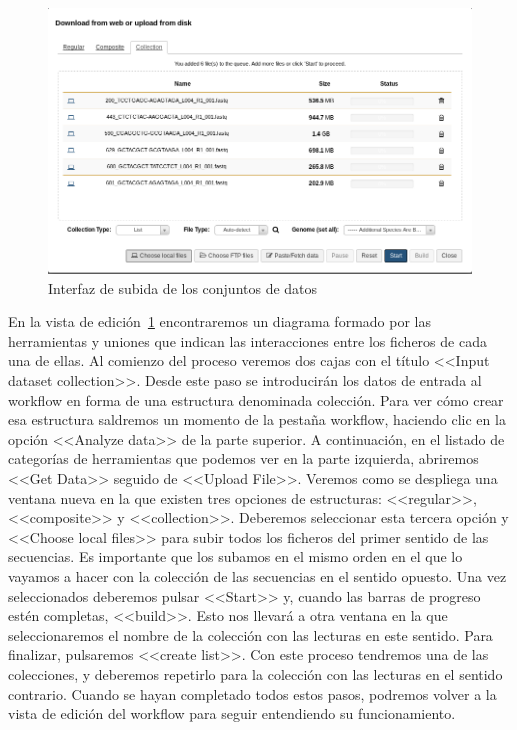 \begin{figure}[!h]
    \begin{center}
      \includegraphics[scale=0.55]{images/SubidaDatasets.png}
      \caption{Interfaz de subida de los conjuntos de datos}
      \label{fig:SubidaDatasets}
    \end{center}
\end{figure}

En la vista de edición~\ref{fig:SubidaDatasets} encontraremos un diagrama formado por las herramientas y uniones que indican las interacciones entre los ficheros de cada una de ellas. Al comienzo del proceso veremos dos cajas con el título <<Input dataset collection>>. Desde este paso se introducirán los datos de entrada al workflow en forma de una estructura denominada colección. Para ver cómo crear esa estructura saldremos un momento de la pestaña workflow, haciendo clic en la opción <<Analyze data>> de la parte superior. A continuación, en el listado de categorías de herramientas que podemos ver en la parte izquierda, abriremos <<Get Data>> seguido de <<Upload File>>. Veremos como se despliega una ventana nueva en la que existen tres opciones de estructuras: <<regular>>, <<composite>> y <<collection>>. Deberemos seleccionar esta tercera opción y <<Choose local files>> para subir todos los ficheros del primer sentido de las secuencias. Es importante que los subamos en el mismo orden en el que lo vayamos a hacer con la colección de las secuencias en el sentido opuesto. Una vez seleccionados deberemos pulsar <<Start>> y, cuando las barras de progreso estén completas, <<build>>. Esto nos llevará a otra ventana en la que seleccionaremos el nombre de la colección con las lecturas en este sentido. Para finalizar, pulsaremos <<create list>>. Con este proceso tendremos una de las colecciones, y deberemos repetirlo para la colección con las lecturas en el sentido contrario. Cuando se hayan completado todos estos pasos, podremos volver a la vista de edición del workflow para seguir entendiendo su funcionamiento.


